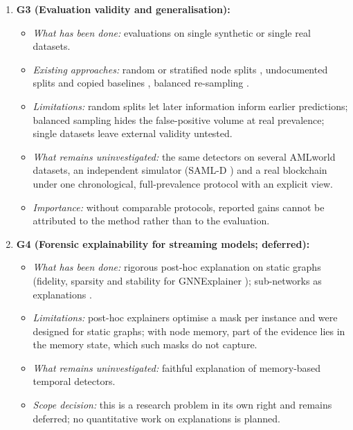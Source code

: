 \documentclass[11pt,a4paper]{article}
\begin{document}
\begin{enumerate}[leftmargin=*]
    \item \textbf{G3 (Evaluation validity and generalisation):}
    \begin{itemize}[leftmargin=*]
        \item \textit{What has been done:} evaluations on single synthetic or single real datasets.
        \item \textit{Existing approaches:} random or stratified node splits \cite{kasula2025ajk,jia2025lmae4eth,alemari2026explainable,lin2026chronowave}, undocumented splits and copied baselines \cite{ferretti2025aml,li2025tfgat}, balanced re-sampling \cite{tian2025kar,rico2026taml}.
        \item \textit{Limitations:} random splits let later information inform earlier predictions; balanced sampling hides the false-positive volume at real prevalence; single datasets leave external validity untested.
        \item \textit{What remains uninvestigated:} the same detectors on several AMLworld datasets, an independent simulator (SAML-D \cite{oztas2023samld}) and a real blockchain under one chronological, full-prevalence protocol with an explicit view.
        \item \textit{Importance:} without comparable protocols, reported gains cannot be attributed to the method rather than to the evaluation.
    \end{itemize}

    \item \textbf{G4 (Forensic explainability for streaming models; deferred):}
    \begin{itemize}[leftmargin=*]
        \item \textit{What has been done:} rigorous post-hoc explanation on static graphs (fidelity, sparsity and stability for GNNExplainer \cite{alemari2026explainable,ying2019gnnexplainer}); sub-networks as explanations \cite{rico2026taml}.
        \item \textit{Limitations:} post-hoc explainers optimise a mask per instance and were designed for static graphs; with node memory, part of the evidence lies in the memory state, which such masks do not capture.
        \item \textit{What remains uninvestigated:} faithful explanation of memory-based temporal detectors.
        \item \textit{Scope decision:} this is a research problem in its own right and remains deferred; no quantitative work on explanations is planned.
    \end{itemize}


\end{enumerate}
\end{document}
